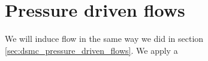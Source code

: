 \section{Pressure driven flows}
We will induce flow in the same way we did in section \ref{sec:dsmc_pressure_driven_flows}. We apply a 